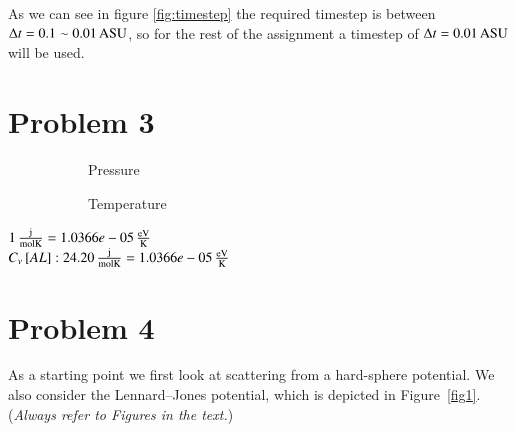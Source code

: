As we can see in figure \ref{fig:timestep} the required timestep is between $\Delta t = 0.1 \sim \unit[0.01]{ASU}$, so for the rest of the assignment a timestep of $\Delta t = \unit[0.01]{ASU}$ will be used.

\section*{Problem 3}

\begin{figure}[H]
    \centering
    \captionsetup[subfigure]{justification=centering}
    \begin{subfigure}[b]{0.40\textwidth}
        \centering
        \resizebox{\columnwidth}{!}{}
        \caption{Pressure}
        \label{fig:otherImg_a}
    \end{subfigure}
    \begin{subfigure}[b]{0.40\textwidth}
        \centering
        \resizebox{\columnwidth}{!}{}
        \caption{Temperature}
        \label{fig:otherImg_b}
    \end{subfigure}
    \caption{}
\end{figure}

$\unit[1]{\frac{j}{mol K}}=\unit[1.0366e-05]{\frac{eV}{K}}$\\

$C_v\left[AL\right]:\unit[24.20]{\frac{j}{mol K}}=\unit[1.0366e-05]{\frac{eV}{K}}$


\section*{Problem 4}

As a starting point we first look at scattering from a hard-sphere
potential. We also consider the Lennard--Jones potential, which is depicted
in Figure~\ref{fig1}. (\emph{Always refer to Figures in the text.})

